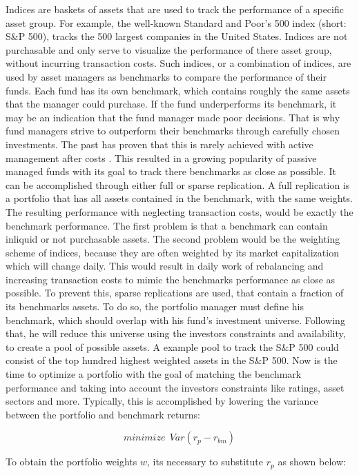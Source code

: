 \documentclass[
  oneside]{book}
\begin{document}
Indices are baskets of assets that are used to track the performance of a specific asset group. For example, the well-known Standard and Poor's 500 index (short: S\&P 500), tracks the 500 largest companies in the United States. Indices are not purchasable and only serve to visualize the performance of there asset group, without incurring transaction costs. Such indices, or a combination of indices, are used by asset managers as benchmarks to compare the performance of their funds. Each fund has its own benchmark, which contains roughly the same assets that the manager could purchase. If the fund underperforms its benchmark, it may be an indication that the fund manager made poor decisions. That is why fund managers strive to outperform their benchmarks through carefully chosen investments. The past has proven that this is rarely achieved with active management after costs \citep{Desm2016}. This resulted in a growing popularity of passive managed funds with its goal to track there benchmarks as close as possible. It can be accomplished through either full or sparse replication. A full replication is a portfolio that has all assets contained in the benchmark, with the same weights. The resulting performance with neglecting transaction costs, would be exactly the benchmark performance. The first problem is that a benchmark can contain inliquid or not purchasable assets. The second problem would be the weighting scheme of indices, because they are often weighted by its market capitalization which will change daily. This would result in daily work of rebalancing and increasing transaction costs to mimic the benchmarks performance as close as possible. To prevent this, sparse replications are used, that contain a fraction of its benchmarks assets. To do so, the portfolio manager must define his benchmark, which should overlap with his fund's investment universe. Following that, he will reduce this universe using the investors constraints and availability, to create a pool of possible assets. A example pool to track the S\&P 500 could consist of the top hundred highest weighted assets in the S\&P 500. Now is the time to optimize a portfolio with the goal of matching the benchmark performance and taking into account the investors constraints like ratings, asset sectors and more. Typically, this is accomplished by lowering the variance between the portfolio and benchmark returns:

\[
 minimize \ \ Var(r_{p}-r_{bm})
\]

To obtain the portfolio weights \(w\), its necessary to substitute \(r_{p}\) as shown below:
\end{document}
